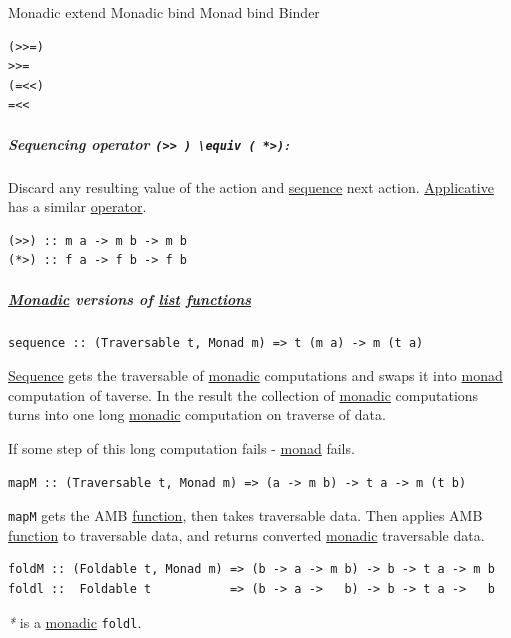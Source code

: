\documentclass[a4paper,14pt,oneside]{book}
\begin{document}
\label{orgcbc5701}Monadic extend
\label{orgda6a9ad}Monadic bind
\label{org95cf430}Monad bind
\label{org6b63dfe}Binder

\begin{verbatim}
(>>=)
>>=
(=<<)
=<<
\end{verbatim}




\subparagraph{\label{org84f0082}Sequencing operator \texttt{(>> ) \textbackslash{}equiv ( *>)}:}
\label{sec:org30294fd}
Discard any resulting value of the action and \hyperref[org7944b85]{sequence} next action.
\hyperref[org5988c0e]{Applicative} has a similar \hyperref[orgc7186b0]{operator}.
\begin{verbatim}
(>>) :: m a -> m b -> m b
(*>) :: f a -> f b -> f b
\end{verbatim}

\subparagraph{\hyperref[org17c3c9d]{Monadic} versions of \hyperref[org8286722]{list} \hyperref[org79edb0b]{functions}}
\label{sec:org2030bd8}
\begin{verbatim}
sequence :: (Traversable t, Monad m) => t (m a) -> m (t a)
\end{verbatim}

\hyperref[org7944b85]{Sequence} gets the traversable of \hyperref[org17c3c9d]{monadic} computations and swaps it into \hyperref[org84837a3]{monad} computation of taverse. In the result the collection of \hyperref[org17c3c9d]{monadic} computations turns into one long \hyperref[org17c3c9d]{monadic} computation on traverse of data.

If some step of this long computation fails - \hyperref[org84837a3]{monad} fails.

\begin{verbatim}
mapM :: (Traversable t, Monad m) => (a -> m b) -> t a -> m (t b)
\end{verbatim}

\texttt{mapM} gets the AMB \hyperref[orgb9cf8e6]{function}, then takes traversable data. Then applies AMB \hyperref[orgb9cf8e6]{function} to traversable data, and returns converted \hyperref[org17c3c9d]{monadic} traversable data.

\begin{verbatim}
foldM :: (Foldable t, Monad m) => (b -> a -> m b) -> b -> t a -> m b
foldl ::  Foldable t           => (b -> a ->   b) -> b -> t a ->   b
\end{verbatim}

\emph{*} is a \hyperref[org17c3c9d]{monadic} \texttt{foldl}.
\end{document}
